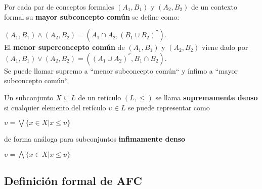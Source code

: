 \documentclass[../../main.tex]{subfiles}
\begin{document}
\begin{definicion}
Por cada par de conceptos formales $(A_1, B_1)$ y $(A_2, B_2)$ de un contexto formal su \textbf{mayor subconcepto común} se define como:
\begin{center}
    $(A_1, B_1) \wedge (A_2, B_2) = (A_1 \cap A_2, (B_1 \cup B_2)^{''}) $. \\
    El \textbf{menor superconcepto común} de $(A_1, B_1)$ y $(A_2, B_2)$ viene dado por \\
    $(A_1, B_1) \vee (A_2, B_2) = ((A_1 \cup A_2)^{''}, B_1 \cap B_2) $. \\
    Se puede llamar supremo a ``menor subconcepto común`` y ínfimo a ``mayor subconcepto común``.
\end{center}
\end{definicion}



\begin{definicion}
Un subconjunto $X \subseteq L$ de un retículo $(L, \leq)$ se llama \textbf{supremamente denso} si cualquier elemento del retículo $\upsilon \in L$ se puede representar como
\begin{center}
    $\upsilon = \bigvee \{ x \in X | x \leq \upsilon \}$
\end{center}
de forma análoga para subconjuntos \textbf{infimamente denso}
\begin{center}
    $\upsilon = \bigwedge \{ x \in X | x \leq \upsilon \}$
\end{center}
\end{definicion}

\newpage\cleardoublepage




\subsection{Definición formal de AFC}
\end{document}
